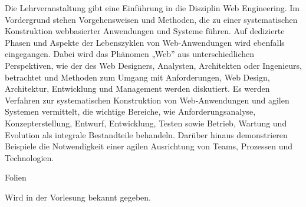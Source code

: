 \begin{course}
\begin{content}
Die Lehrveranstaltung gibt eine Einführung in die Disziplin Web Engineering. Im Vordergrund stehen Vorgehensweisen und Methoden, die zu einer systematischen Konstruktion webbasierter Anwendungen und Systeme führen. Auf dedizierte Phasen und Aspekte der Lebenszyklen von Web-Anwendungen wird ebenfalls eingegangen. Dabei wird das Phänomen „Web” aus unterschiedlichen Perspektiven, wie der des Web Designers, Analysten, Architekten oder Ingenieurs, betrachtet und Methoden zum Umgang mit Anforderungen, Web Design, Architektur, Entwicklung und Management werden diskutiert. Es werden Verfahren zur systematischen Konstruktion von Web-Anwendungen und agilen Systemen vermittelt, die wichtige Bereiche, wie Anforderungsanalyse, Konzepterstellung, Entwurf, Entwicklung, Testen sowie Betrieb, Wartung und Evolution als integrale Bestandteile behandeln. Darüber hinaus demonstrieren Beispiele die Notwendigkeit einer agilen Ausrichtung von Teams, Prozessen und Technologien.


\end{content}

\begin{media}Folien

\end{media}

\begin{literature}Wird in der Vorlesung bekannt gegeben.

\end{literature}



\end{course}